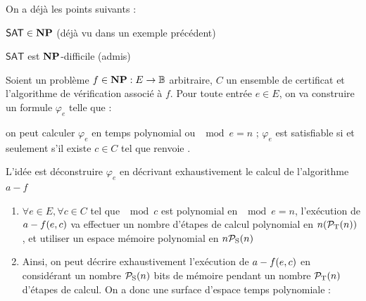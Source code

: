 \documentclass[a4paper,french,bookmarks]{book}
\newcommand{\cNP}{\bbN\bbP}
\newcommand{\SAT}{\textsf{SAT}}
\begin{document}
    \begin{nproof}
        On a déjà les points suivants :
        \begin{enumerate}
            \itt $\SAT \in \cNP$ (déjà vu dans un exemple précédent)
            
            \itt $\SAT$ est $\cNP$-difficile (admis)
        \end{enumerate}

        Soient un problème $f \in \cNP : E \to \bdB$ arbitraire, $C$ un ensemble de certificat et  l'algorithme de vérification associé à $f$. Pour toute entrée $e \in E$, on va construire un formule $\varphi_e$ telle que :
        \begin{enumerate}
            \itt on peut calculer $\varphi_e$ en temps polynomial ou $\mod e = n$ ;
            \itt $\varphi_e$ est satisfiable si et seulement s'il existe $c \in C$ tel que  renvoie .
        \end{enumerate}
        L'idée est déconstruire $\varphi_e$ en décrivant exhaustivement le calcul de l'algorithme $a-f$

        \begin{enumerate}
            \item $\forall e \in E, \forall c \in C$ tel que $\mod c$ est polynomial en $\mod e = n$, l'exécution de $a-f \!\left(e, c\right)$ va effectuer un nombre d'étapes de calcul polynomial en $n \!\left(\mathcal{P}_\text T\!\left(n\right)\right)$, et utiliser un espace mémoire polynomial en $n \mathcal{P}_\text S\!\left(n\right)$
            \item Ainsi, on peut décrire exhaustivement l'exécution de $a-f \!\left(e, c\right)$ en considérant un nombre $\mathcal{P}_\text S\!\left(n\right)$ bits de mémoire pendant un nombre $\mathcal{P}_\text T\!\left(n\right)$ d'étapes de calcul.
            On a donc une surface d'espace temps polynomiale :

            \begin{center}
\end{center}
\end{enumerate}
\end{nproof}
\end{document}
